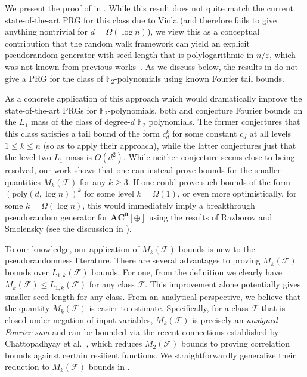 \documentclass[10pt,a4paper]{article}
\newcommand{\eps}{\varepsilon}
\theoremstyle{definition}
\begin{document}
We present the proof of  in . While this result does not quite match the current state-of-the-art PRG for this class due to Viola \cite{viola2009sum}  (and therefore fails to give anything nontrivial for $d=\Omega(\log n)$),  we view this as a conceptual contribution  that the random walk framework can yield an explicit pseudorandom generator with seed length that is polylogarithmic in $n/\eps$, which was not known from previous works~\cite{CHHL,CHLT}.  As we discuss below, the results in \cite{CHHL,CHLT} do not give a PRG for the class of $\mathbb{F}_2$-polynomials using known Fourier tail bounds. 

As a concrete application of this approach which would dramatically improve the state-of-the-art PRGs for $\mathbb{F}_2$-polynomials, both \cite{CHHL} and \cite{CHLT} conjecture Fourier bounds on the $L_1$ mass of the class of degree-$d$ $\mathbb{F}_2$ polynomials. The former conjectures that this class satisfies a tail bound of the form $c_d^k$ for some constant $c_d$ at all levels $1\leq k\leq n$ (so as to apply their approach), while the latter conjectures just that the level-two $L_1$ mass is $O(d^2)$.  While neither conjecture seems close to being resolved, {our work shows that one can instead prove bounds for the smaller quantities $M_k(\mathcal{F})$ for any $k\geq 3$.} If one could prove such bounds of the form $(\text{poly}(d,\log n))^k$ for some level $k=\Omega(1)$, or even more optimistically, for some $k=\Omega(\log n)$, this would immediately imply a breakthrough pseudorandom generator for $\mathbf{AC^0[\oplus]}$ using the results of Razborov \cite{Razborov1987} and Smolensky \cite{Smolensky1,Smolensky2} (see the discussion in \cite{CHLT}).



{To our knowledge, our application of $M_k(\mathcal{F})$ bounds is new to the pseudorandomness literature.  There are several advantages to proving $M_k(\mathcal{F})$ bounds over $L_{1,k}(\mathcal{F})$ bounds. For one, from the definition we clearly have $M_{k}(\mathcal{F})\leq L_{1,k}(\mathcal{F})$ for any class $\mathcal{F}$.  This improvement alone potentially gives smaller seed length for any class. From an analytical perspective, we believe that the quantity $M_k(\mathcal{F})$ is easier to estimate.  Specifically, for a class $\mathcal{F}$ that is closed under negation of input variables, $M_k(\mathcal{F})$ is precisely an \emph{unsigned
%
Fourier sum} and can be bounded via the recent connections established by Chattopadhyay {et al.}~\cite{xorlemma}, which reduces $M_2(\mathcal{F})$ bounds to proving correlation bounds against certain resilient functions.  We straightforwardly generalize their reduction to $M_k(\mathcal{F})$ bounds in .}
\end{document}
